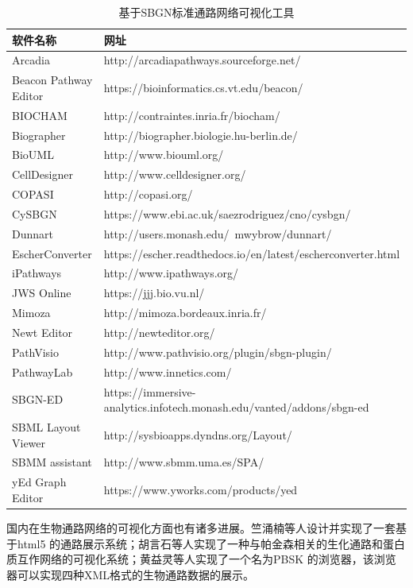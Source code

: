 \begin{table}[htbp]
  \centering
	\caption[table2]{基于SBGN标准通路网络可视化工具}
\vspace{0.5em}\wuhao
\begin{tabularx}{1.0\textwidth}{lX}
\toprule[1.5pt]
软件名称 & 网址 \\
\midrule[1pt]
Arcadia	 &  http://arcadiapathways.sourceforge.net/\\
Beacon Pathway Editor	 & https://bioinformatics.cs.vt.edu/beacon/\\
BIOCHAM	 & http://contraintes.inria.fr/biocham/\\
Biographer	 & http://biographer.biologie.hu-berlin.de/\\
BioUML	& http://www.biouml.org/\\
CellDesigner & http://www.celldesigner.org/\\
COPASI	& http://copasi.org/\\
CySBGN	 & https://www.ebi.ac.uk/saezrodriguez/cno/cysbgn/\\
Dunnart	 & http://users.monash.edu/~mwybrow/dunnart/\\
EscherConverter		& https://escher.readthedocs.io/en/latest/escherconverter.html\\
iPathways	 & http://www.ipathways.org/\\
JWS Online	& https://jjj.bio.vu.nl/\\
Mimoza	 & http://mimoza.bordeaux.inria.fr/\\
Newt Editor	& http://newteditor.org/\\
PathVisio	& http://www.pathvisio.org/plugin/sbgn-plugin/\\
PathwayLab	& http://www.innetics.com/\\
SBGN-ED	  & https://immersive-analytics.infotech.monash.edu/vanted/addons/sbgn-ed \\
SBML Layout Viewer	 & http://sysbioapps.dyndns.org/Layout/\\
SBMM assistant	 & http://www.sbmm.uma.es/SPA/\\
yEd Graph Editor	& https://www.yworks.com/products/yed\\

\bottomrule[1.5pt]
\end{tabularx}
\end{table}

国内在生物通路网络的可视化方面也有诸多进展。竺涌楠\cite{zhu2015}等人设计并实现了一套基于html5 的通路展示系统；胡言石\cite{huyanshi}等人实现了一种与帕金森相关的生化通路和蛋白质互作网络的可视化系统；黄益灵\cite{huang2011PBSK}等人实现了一个名为PBSK 的浏览器，该浏览器可以实现四种XML格式的生物通路数据的展示。

